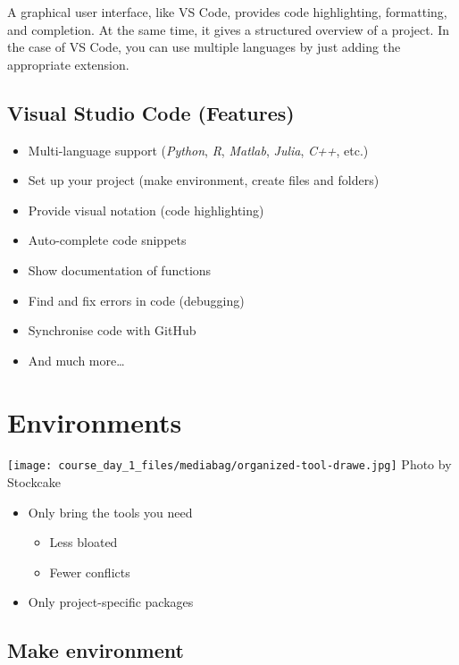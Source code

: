 \documentclass[
  letterpaper,
  DIV=11,
  numbers=noendperiod]{scrartcl}
\providecommand{\tightlist}{%
  \setlength{\itemsep}{0pt}\setlength{\parskip}{0pt}}\usepackage{longtable,booktabs,array}
\begin{document}
A graphical user interface, like VS Code, provides code highlighting,
formatting, and completion. At the same time, it gives a structured
overview of a project. In the case of VS Code, you can use multiple
languages by just adding the appropriate extension.

\subsection{Visual Studio Code
(Features)}\label{visual-studio-code-features}

\begin{itemize}
\tightlist
\item
  Multi-language support (\emph{Python}, \emph{R}, \emph{Matlab},
  \emph{Julia}, \emph{C++}, etc.)
\item
  Set up your project (make environment, create files and folders)
\item
  Provide visual notation (code highlighting)
\item
  Auto-complete code snippets
\item
  Show documentation of functions
\item
  Find and fix errors in code (debugging)
\item
  Synchronise code with GitHub
\item
  And much more\ldots{}
\end{itemize}

\section{Environments}\label{environments}

\texttt{[image: course\_day\_1\_files/mediabag/organized-tool-drawe.jpg]}
Photo by Stockcake

\begin{itemize}
\tightlist
\item
  Only bring the tools you need

  \begin{itemize}
  \tightlist
  \item
    Less bloated
  \item
    Fewer conflicts
  \end{itemize}
\item
  Only project-specific packages
\end{itemize}

\subsection{Make environment}\label{make-environment}
\end{document}
